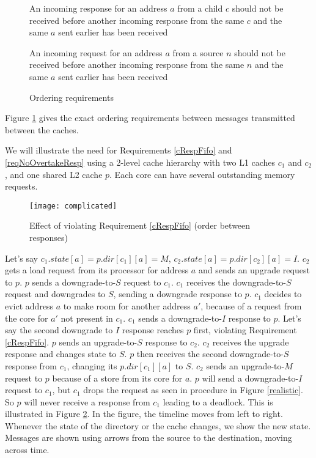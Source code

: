 
\begin{figure}\small
\begin{requirement}
An incoming response for an address $a$ from a child $c$ should not be
received before another incoming response from the same $c$ and the
same $a$ sent earlier has been received\label{cRespFifo}
\end{requirement}
\begin{requirement}
An incoming request for an address $a$ from a source $n$ should not be
received before another incoming response from the same $n$ and the
same $a$ sent earlier has been received\label{reqNoOvertakeResp}
\end{requirement}
\caption{Ordering requirements}
\label{order}
\end{figure}

Figure \ref{order} gives the exact ordering
requirements between messages transmitted between the caches.

We will illustrate the need for Requirements \ref{cRespFifo} and
\ref{reqNoOvertakeResp} using a 2-level cache hierarchy with two L1 caches $c_1$ and
$c_2$, and one shared L2 cache $p$. Each core can have several outstanding
memory requests.

\begin{figure}
\centering
\texttt{[image: complicated]}
\caption{Effect of violating Requirement \ref{cRespFifo} (order between responses)}
\label{complicated}
\end{figure}

Let's say $c_1.state[a] = p.dir[c_1][a] = M$, $c_2.state[a] = p.dir[c_2][a] =
I$. $c_2$ gets a load request from its processor for address $a$ and sends an
upgrade request to $p$. $p$ sends a downgrade-to-$S$ request to $c_1$. $c_1$
receives the downgrade-to-$S$ request and downgrades to $S$, sending a downgrade
response to $p$. $c_1$ decides to evict address $a$ to make room for another
address $a'$, because of a request from the core for $a'$ not present in $c_1$.
$c_1$ sends a downgrade-to-$I$ response to $p$. Let's say the second downgrade
to $I$ response reaches $p$ first, violating Requirement \ref{cRespFifo}. $p$
sends an upgrade-to-$S$ response to $c_2$. $c_2$ receives the upgrade response
and changes state to $S$. $p$ then receives the second downgrade-to-$S$ response
from $c_1$, changing its $p.dir[c_1][a]$ to $S$. $c_2$ sends an upgrade-to-$M$
request to $p$ because of a store from its core for $a$. $p$ will send a
downgrade-to-$I$ request to $c_1$, but $c_1$ drops the request as seen in
procedure \dReq{} in Figure \ref{realistic}. So $p$ will never receive a
response from $c_1$ leading to a deadlock. This is illustrated in Figure
\ref{complicated}. In the figure, the timeline moves from left to right.
Whenever the state of the directory or the cache changes, we show the new state.
Messages are shown using arrows from the source to the destination, moving
across time.

